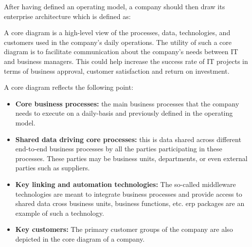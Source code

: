 %
%
After having defined an operating model, a company should then draw its enterprise architecture which is
defined as:


A core diagram is a high-level view of the processes, data, technologies,
and customers used in the company’s daily operations.
The utility of such a core diagram is to facilitate communication about the company’s needs between IT
and business managers.
This could help increase the success rate of IT projects in terms of business approval,
customer satisfaction and return on investment.

A core diagram reflects the following point:

\begin{itemize}
    \item \textbf{Core business processes:} the main business processes that the company needs to execute on a
          daily-basis and previously defined in the operating model.
    \item \textbf{Shared data driving core processes:} this is data shared across different end-to-end
          business processes by all the parties participating in these processes.
          These parties may be business units, departments, or even external parties such as suppliers.
    \item \textbf{Key linking and automation technologies:} The so-called middleware technologies are meant to
          integrate business processes and provide access to shared data cross business units, business functions, etc.
          \gls{erp} packages are an example of such a technology.
    \item \textbf{Key customers:} The primary customer groups of the company are also depicted in the
          core diagram of a company.
\end{itemize}

